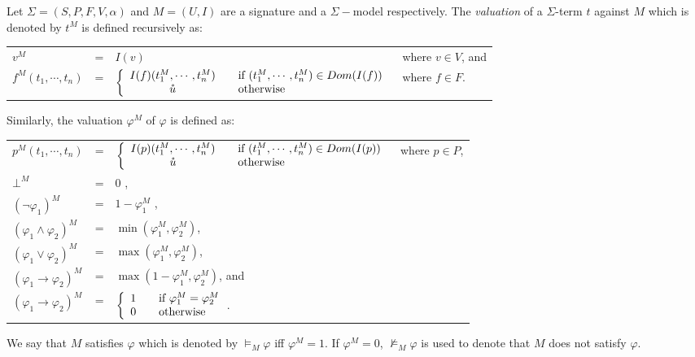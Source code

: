 \begin{definition} \label{def:smt-valuation}
Let $\Sigma = (S, P, F, V, \alpha)$ and $M=(U, I)$ are a signature and a $\Sigma-$model respectively. The \emph{valuation} of a $\Sigma$-term $t$ against $M$ which is denoted by $t^M$ is defined recursively as:
\begin{center}
\begin{tabular}{l c l l}
$v^M$ &=& $I(v)$ & where $v \in V$, and \\
$f^M(t_1, \cdots, t_n)$ &=& $\left\{ 
  \begin{array}{c l}
    I(f)(t_1^M, \cdots, t_n^M) & \quad \text{if } (t_1^M, \cdots, t_n^M) \in Dom(I(f))\\
    \mathring{u} & \quad \text{otherwise }\\
  \end{array} \right.$ & where $f \in F$. \\
\end{tabular}
\end{center}
Similarly, the valuation $\varphi^M$ of $\varphi$ is defined as:
\begin{center}
\begin{tabular}{l c l l}
$p^M(t_1,\cdots,t_n)$ &=& $\left\{ 
  \begin{array}{c l}
    I(p)(t_1^M,\cdots,t_n^M) & \quad \text{if } (t_1^M, \cdots, t_n^M) \in Dom(I(p))\\
    \mathring{u} & \quad \text{otherwise }\\
  \end{array} \right.$ & where $p \in P$, \\
$\bot^M$ &=& $0$ ,& \\
$(\neg \varphi_1)^M$ &=& $1 - \varphi_1^M$ ,& \\
$(\varphi_1 \wedge \varphi_2)^M$ &=& $\min(\varphi_1^M, \varphi_2^M)$, & \\
$(\varphi_1 \vee \varphi_2)^M$ &=& $\max(\varphi_1^M, \varphi_2^M)$, & \\
$(\varphi_1 \rightarrow \varphi_2)^M$ &=& $\max(1-\varphi_1^M, \varphi_2^M)$, and & \\
$(\varphi_1 \rightarrow \varphi_2)^M$ &=& $\left\{ 
  \begin{array}{c l}
    1 & \quad \text{if } \varphi_1^M = \varphi_2^M \\
    0 & \quad \text{otherwise }\\
  \end{array} \right.$. &
\end{tabular}
\end{center}
We say that $M$ satisfies $\varphi$ which is denoted by $\models_M \varphi$ iff $\varphi^M = 1$. If $\varphi^M = 0$, $\not\models_M \varphi$ is used to denote that $M$ does not satisfy $\varphi$.
\end{definition}


